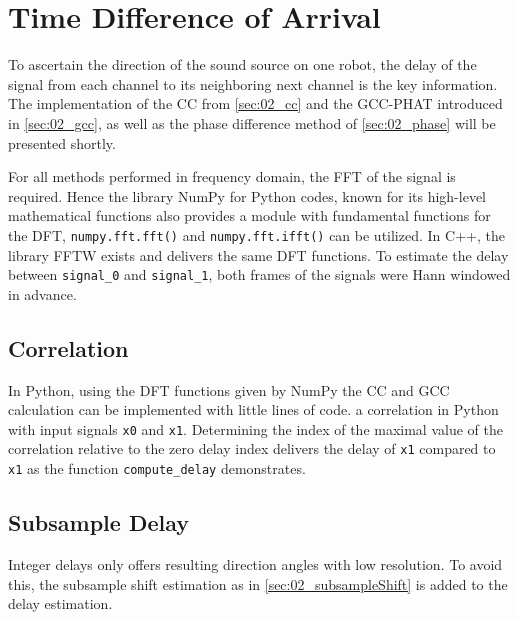 \section{Time Difference of Arrival}
\label{sec:03_tdoa}

To ascertain the direction of the sound source on one robot, the
delay of the signal from each channel to its neighboring
next channel is the key information.
The implementation of the \ac{CC} from \cref{sec:02_cc} and the \ac{GCC-PHAT}
introduced in \cref{sec:02_gcc}, as well as the phase difference method
of \cref{sec:02_phase} will be presented shortly.

For all methods performed in frequency domain, the \ac{FFT} of the
signal is required. Hence the library NumPy for Python codes, known for its high-level
mathematical functions also provides a module with fundamental
functions for the \ac{DFT}, \lstinline!numpy.fft.fft()! and
\lstinline!numpy.fft.ifft()! can be utilized.
In C++, the library \ac{FFTW} exists and delivers the same \ac{DFT} functions.
To estimate the delay between \lstinline!signal_0! and \lstinline!signal_1!,
both frames of the signals were Hann windowed in advance.
\subsection*{Correlation}
\label{subsec:03_cc}

In Python, using the \ac{DFT} functions given by NumPy the \ac{CC} and \ac{GCC} calculation
can be implemented with little lines of code.
a correlation in Python with input signals \lstinline!x0! and \lstinline!x1!.
Determining the index of the maximal value of the correlation relative to the zero delay
index delivers the delay of \lstinline!x1! compared to \lstinline!x1! as the function
\lstinline!compute_delay! demonstrates.
\subsection*{Subsample Delay}
\label{subsec:03_subsample}

Integer delays only offers resulting direction angles with low resolution.
To avoid this, the subsample shift estimation as in \cref{sec:02_subsampleShift}
is added to the delay estimation.

